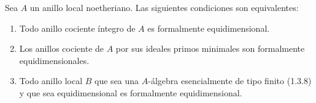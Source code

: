 \begin{theorem}[7.1.8]
\label{IV.2.s7.1.8-fr}
Sea $A$ un anillo local noetheriano. Las siguientes
condiciones son equivalentes:
\begin{enumerate}
\item[\textup{a)}] Todo anillo cociente íntegro de $A$ es
formalmente equidimensional.
\item[\textup{b)}] Los anillos cociente de $A$ por sus ideales
primos minimales son formalmente equidimensionales.
\item[\textup{c)}] Todo anillo local $B$ que sea una
$A$-álgebra esencialmente de tipo finito \textup{(1.3.8)}
y que sea equidimensional es formalmente
equidimensional.
\end{enumerate}
\end{theorem}

